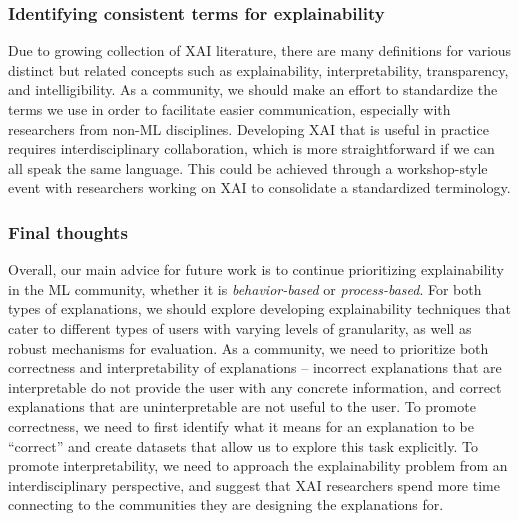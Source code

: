 \subsubsection{Identifying consistent terms for explainability}
Due to growing collection of XAI literature, there are many definitions for various distinct but related concepts such as explainability, interpretability, transparency, and intelligibility. 
As a community, we should make an effort to standardize the terms we use in order to facilitate easier communication, especially with researchers from non-ML disciplines. 
Developing XAI that is useful in practice requires interdisciplinary collaboration, which is more straightforward if we can all speak the same language. 
This could be achieved through a workshop-style event with researchers working on XAI to consolidate a standardized terminology. 

\pagebreak

\subsubsection{Final thoughts} 
Overall, our main advice for future work is to continue prioritizing explainability in the ML community, whether it is \emph{behavior-based} or \emph{process-based}. 
For both types of explanations, we should explore developing explainability techniques that cater to different types of users with varying levels of granularity, as well as robust mechanisms for evaluation. 
As a community, we need to prioritize both correctness and interpretability of explanations -- incorrect explanations that are interpretable do not provide the user with any concrete information, and correct explanations that are uninterpretable are not useful to the user. 
To promote correctness, we need to first identify what it means for an explanation to be ``correct'' and create datasets that allow us to explore this task explicitly. 
To promote interpretability, we need to approach the explainability problem from an interdisciplinary perspective, and suggest that XAI researchers spend more time connecting to the communities they are designing the explanations for. 





